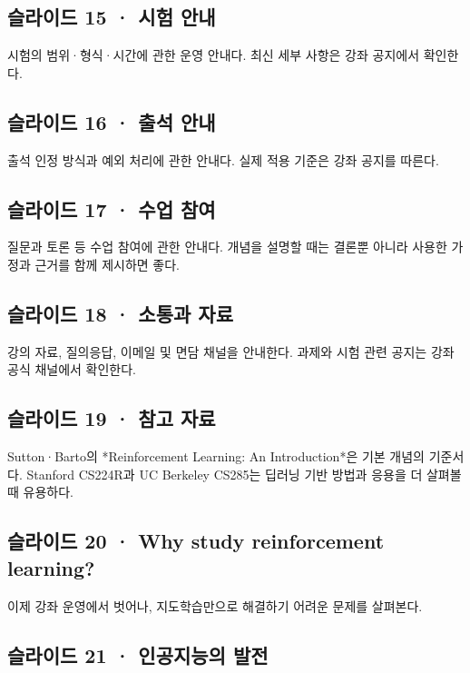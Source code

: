 \documentclass[11pt,a4paper]{article}
\begin{document}
\subsection{슬라이드 15 · 시험 안내}

시험의 범위·형식·시간에 관한 운영 안내다. 최신 세부 사항은 강좌 공지에서 확인한다.\par

\subsection{슬라이드 16 · 출석 안내}

출석 인정 방식과 예외 처리에 관한 안내다. 실제 적용 기준은 강좌 공지를 따른다.\par

\subsection{슬라이드 17 · 수업 참여}

질문과 토론 등 수업 참여에 관한 안내다. 개념을 설명할 때는 결론뿐 아니라 사용한 가정과 근거를 함께 제시하면 좋다.\par

\subsection{슬라이드 18 · 소통과 자료}

강의 자료, 질의응답, 이메일 및 면담 채널을 안내한다. 과제와 시험 관련 공지는 강좌 공식 채널에서 확인한다.\par

\subsection{슬라이드 19 · 참고 자료}

Sutton·Barto의 *Reinforcement Learning: An Introduction*은 기본 개념의 기준서다. Stanford CS224R과 UC Berkeley CS285는 딥러닝 기반 방법과 응용을 더 살펴볼 때 유용하다.\par

\subsection{슬라이드 20 · Why study reinforcement learning?}

이제 강좌 운영에서 벗어나, 지도학습만으로 해결하기 어려운 문제를 살펴본다.\par

\subsection{슬라이드 21 · 인공지능의 발전}
\end{document}
